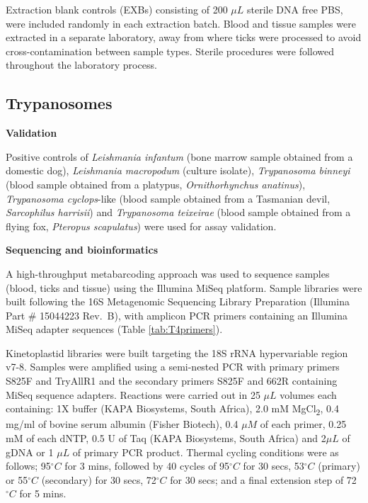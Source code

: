 \documentclass[a4paper, nobind]{templates/ociamthesis}
\begin{document}
Extraction blank controls (EXBs) consisting of 200 \(\mu L\) sterile DNA free PBS, were included randomly in each extraction batch. Blood and tissue samples were extracted in a separate laboratory, away from where ticks were processed to avoid cross-contamination between sample types. Sterile procedures were followed throughout the laboratory process.

\hypertarget{trypanosomes}{%
\subsection{Trypanosomes}\label{trypanosomes}}

\textbf{Validation}

Positive controls of \emph{Leishmania infantum} (bone marrow sample obtained from a domestic dog), \emph{Leishmania macropodum} (culture isolate), \emph{Trypanosoma binneyi} (blood sample obtained from a platypus, \emph{Ornithorhynchus anatinus}), \emph{Trypanosoma cyclops}-like (blood sample obtained from a Tasmanian devil, \emph{Sarcophilus harrisii}) and \emph{Trypanosoma teixeirae} (blood sample obtained from a flying fox, \emph{Pteropus scapulatus}) were used for assay validation.

\textbf{Sequencing and bioinformatics}

A high-throughput metabarcoding approach was used to sequence samples (blood, ticks and tissue) using the Illumina MiSeq platform. Sample libraries were built following the 16S Metagenomic Sequencing Library Preparation (Illumina Part \# 15044223 Rev.~B), with amplicon PCR primers containing an Illumina MiSeq adapter sequences (Table \ref{tab:T4primers}).

Kinetoplastid libraries were built targeting the 18S rRNA hypervariable region v7-8. Samples were amplified using a semi-nested PCR with primary primers S825F and TryAllR1 \autocite{maslovPhylogenyTrypanosomesInferred1996,barbosaIncreasedGeneticDiversity2017} and the secondary primers S825F and 662R \autocite{maslovPhylogenyTrypanosomesInferred1996} containing MiSeq sequence adapters.
Reactions were carried out in 25 \(\mu L\) volumes each containing: 1X buffer (KAPA Biosystems, South Africa), 2.0 mM MgCl\textsubscript{2}, 0.4 mg/ml of bovine serum albumin (Fisher Biotech), 0.4 \(\mu M\) of each primer, 0.25 mM of each dNTP, 0.5 U of Taq (KAPA Biosystems, South Africa) and 2\(\mu L\) of gDNA or 1 \(\mu L\) of primary PCR product.
Thermal cycling conditions were as follows; 95\(^\circ C\) for 3 mins, followed by 40 cycles of 95\(^\circ C\) for 30 secs, 53\(^\circ C\) (primary) or 55\(^\circ C\) (secondary) for 30 secs, 72\(^\circ C\) for 30 secs; and a final extension step of 72\(^\circ C\) for 5 mins.
\end{document}
